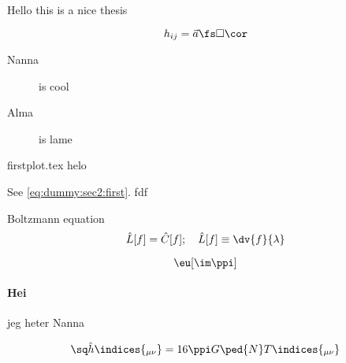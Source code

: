 

Hello this is a nice thesis

\begin{equation}\label{eq:dummy:sec2:first}
    h_{ij} = \vec{a} \fs \Box \cor 
\end{equation}


\begin{description}
    \item[Nanna] is cool 
    \item[Alma] is lame 
\end{description}


{firstplot.tex}
helo

\cite{amrParticleProductionGravitational2019, azatovDarkMatterProduction2021}

See \ref{eq:dummy:sec2:first}. fdf \cite{vachaspatiKinksDomainWalls2006}

Boltzmann equation
\begin{equation}
    \hat{L}[f] = \hat{C}[f]; \quad \hat{L}[f]\equiv \dv{f}{\lambda}
\end{equation}

\begin{equation}
   \eu[\im \ppi]
\end{equation}

\paragraph*{Hei} jeg heter Nanna



\begin{equation}
    \sq \hat{h}\indices{_{\mu \nu}} = 16\ppi G\ped{N} T\indices{_{\mu\nu}}
\end{equation}